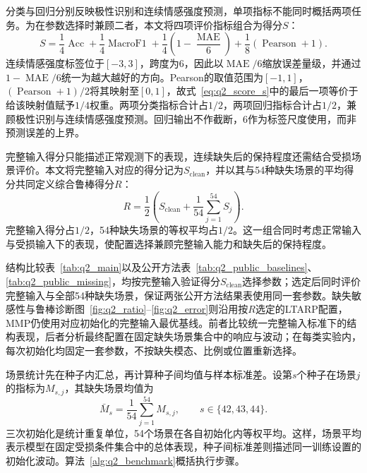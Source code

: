 \documentclass[UTF8,a4paper,11pt]{ctexart}
\newcommand{\QTwoParagraph}{\par\noindent\hspace*{2em}}
\newcounter{q2algorithm}
\begin{document}
\QTwoParagraph 分类与回归分别反映极性识别和连续情感强度预测，单项指标不能同时概括两项任务。为在参数选择时兼顾二者，本文将四项评价指标组合为得分$S$：
\begin{equation}
S = \frac{1}{4}\operatorname{Acc} + \frac{1}{4}\operatorname{MacroF1} + \frac{1}{4}\left(1 - \frac{\operatorname{MAE}}{6}\right) + \frac{1}{8}(\operatorname{Pearson} + 1).
\label{eq:q2_score_s}
\end{equation}
连续情感强度标签位于$[-3,3]$，跨度为6，因此以$\operatorname{MAE}/6$缩放误差量级，并通过$1-\operatorname{MAE}/6$统一为越大越好的方向。Pearson的取值范围为$[-1,1]$，$(\operatorname{Pearson}+1)/2$将其映射至$[0,1]$，故式~\eqref{eq:q2_score_s}中的最后一项等价于给该映射值赋予$1/4$权重。两项分类指标合计占$1/2$，两项回归指标合计占$1/2$，兼顾极性识别与连续情感强度预测。回归输出不作截断，6作为标签尺度使用，而非预测误差的上界。

\QTwoParagraph 完整输入得分只能描述正常观测下的表现，连续缺失后的保持程度还需结合受损场景评价。本文将完整输入对应的得分记为$S_{\mathrm{clean}}$，并以其与54种缺失场景的平均得分共同定义综合鲁棒得分$R$：
\begin{equation}
R = \frac{1}{2}\left(S_{\mathrm{clean}} + \frac{1}{54}\sum_{j=1}^{54} S_j\right).
\label{eq:q2_robust_r}
\end{equation}
完整输入得分占$1/2$，54种缺失场景的等权平均占$1/2$。这一组合同时考虑正常输入与受损输入下的表现，使配置选择兼顾完整输入能力和缺失后的保持程度。

\QTwoParagraph 结构比较表~\ref{tab:q2_main}以及公开方法表~\ref{tab:q2_public_baselines}、\ref{tab:q2_public_missing}，均按完整输入验证得分$S_{\mathrm{clean}}$选择参数；选定后同时评价完整输入与全部54种缺失场景，保证两张公开方法结果表使用同一套参数。缺失敏感性与鲁棒诊断图~\ref{fig:q2_ratio}--\ref{fig:q2_error}则沿用按$R$选定的LTARP配置，MMP仍使用对应初始化的完整输入最优基线。前者比较统一完整输入标准下的结构表现，后者分析最终配置在固定缺失场景集合中的响应与波动；在每类实验内，每次初始化均固定一套参数，不按缺失模态、比例或位置重新选择。

\QTwoParagraph 场景统计先在种子内汇总，再计算种子间均值与样本标准差。设第$s$个种子在场景$j$的指标为$M_{s,j}$，其缺失场景均值为
\begin{equation}
\bar M_s = \frac{1}{54}\sum_{j=1}^{54}M_{s,j}, \qquad s\in\{42,43,44\}.
\end{equation}
三次初始化是统计重复单位，54个场景在各自初始化内等权平均。这样，场景平均表示模型在固定受损条件集合中的总体表现，种子间标准差则描述同一训练设置的初始化波动。算法~\ref{alg:q2_benchmark}概括执行步骤。
\end{document}
